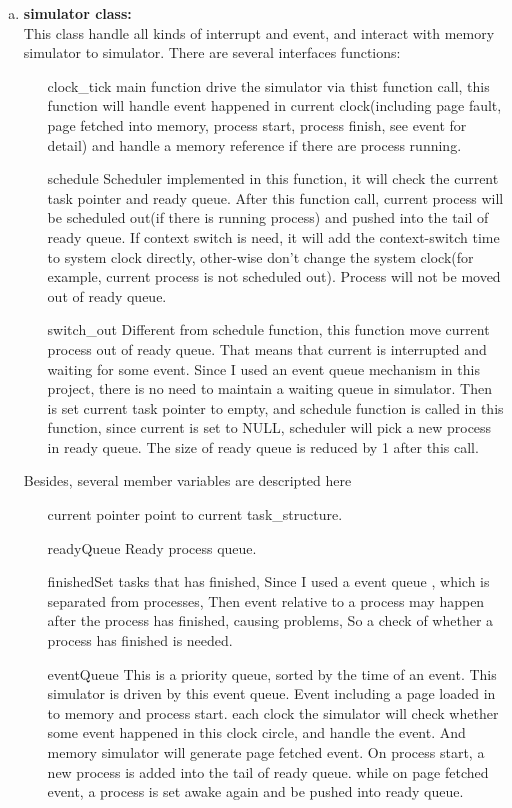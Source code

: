 \documentclass[12pt,a4paper]{article}
\begin{document}
\begin{enumerate}[\bf I]
\begin{enumerate}[a)]
				\item \textbf{simulator class:}\\
					This class handle all kinds of interrupt and event, and interact with memory simulator to simulator. There are several interfaces functions:
					\begin{enumerate}
						\item[clock\_tick] main function drive the simulator via thist function call, this function will handle event happened in current clock(including page fault, page fetched into memory, process start, process finish, see event for detail) and handle a memory reference if there are process running.
						\item[schedule] Scheduler implemented in this function, it will check the current task pointer and ready queue. After this function call, current process will be scheduled out(if there is running process) and pushed into the tail of ready queue. If context switch is need, it will add the context-switch time to system clock directly, other-wise don't change the system clock(for example, current process is not scheduled out). Process will not be moved out of ready queue.
						\item[switch\_out] Different from schedule function, this function move current process out of ready queue. That means that current is interrupted and waiting for some event. Since I used an event queue mechanism in this project, there is no need to maintain a waiting queue in simulator. Then is set current task pointer to empty, and schedule function is called in this function, since current is set to NULL, scheduler will pick a new process in ready queue. The size of ready queue is reduced by 1 after this call.
					\end{enumerate}
					Besides, several member variables are descripted here
					\begin{enumerate}
						\item[current] pointer point to current task\_structure.
						\item[readyQueue] Ready process queue.
						\item[finishedSet] tasks that has finished, Since I used a event queue , which is separated from processes, Then event relative to a process may happen after the process has finished, causing problems, So a check of whether a process has finished is needed.
						\item[eventQueue] This is a priority queue, sorted by the time of an event. This simulator is driven by this event queue. Event including a page loaded in to memory and process start. each clock the simulator will check whether some event happened in this clock circle, and handle the event. And memory simulator will generate page fetched event. On process start, a new process is added into the tail of ready queue. while on page fetched event, a process is set awake again and be pushed into ready queue.

\end{enumerate}
\end{enumerate}
\end{enumerate}
\end{document}
